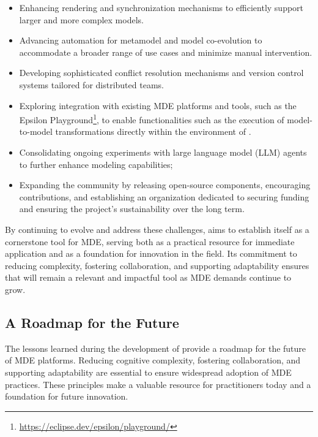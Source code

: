 \begin{itemize}
    \item Enhancing rendering and synchronization mechanisms to efficiently support larger and more complex models.
    \item Advancing automation for metamodel and model co-evolution to accommodate a broader range of use cases and minimize manual intervention.
    \item Developing sophisticated conflict resolution mechanisms and version control systems tailored for distributed teams.
    \item Exploring integration with existing MDE platforms and tools, such as the Epsilon Playground\footnote{\url{https://eclipse.dev/epsilon/playground/}}, to enable functionalities such as the execution of model-to-model transformations directly within the environment of \jjodel{}.
    \item Consolidating ongoing experiments with large language model (LLM) agents to further enhance modeling capabilities;
    \item Expanding the \jjodel{} community by releasing open-source components, encouraging contributions, and establishing an organization dedicated to securing funding and ensuring the project’s sustainability over the long term.
\end{itemize}

By continuing to evolve and address these challenges, \jjodel{} aims to establish itself as a cornerstone tool for MDE, serving both as a practical resource for immediate application and as a foundation for innovation in the field. Its commitment to reducing complexity, fostering collaboration, and supporting adaptability ensures that \jjodel{} will remain a relevant and impactful tool as MDE demands continue to grow.

\subsection{A Roadmap for the Future}

The lessons learned during the development of \jjodel{} provide a roadmap for the future of MDE platforms. Reducing cognitive complexity, fostering collaboration, and supporting adaptability are essential to ensure widespread adoption of MDE practices. These principles make \jjodel{} a valuable resource for practitioners today and a foundation for future innovation.  

